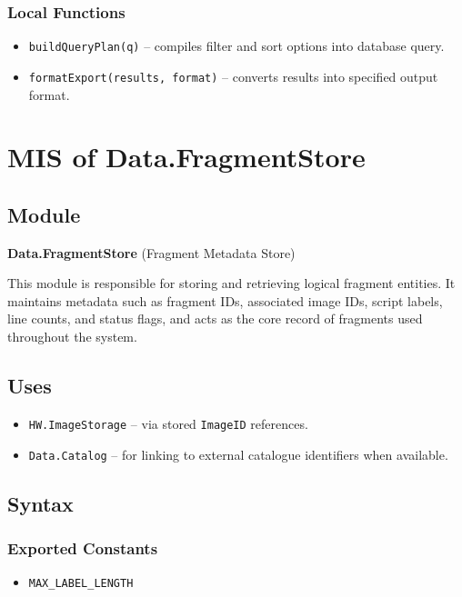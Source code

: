 \documentclass[12pt, titlepage]{article}
\begin{document}
\subsubsection{Local Functions}
\begin{itemize}
    \item \texttt{buildQueryPlan(q)} – compiles filter and sort options into database query.
    \item \texttt{formatExport(results, format)} – converts results into specified output format.
\end{itemize}


\section{MIS of Data.FragmentStore} \label{Data.FragmentStore}

\subsection{Module}
\textbf{Data.FragmentStore} \; (Fragment Metadata Store)

This module is responsible for storing and retrieving logical fragment entities. It maintains metadata such as fragment IDs, associated image IDs, script labels, line counts, and status flags, and acts as the core record of fragments used throughout the system.

\subsection{Uses}
\begin{itemize}
    \item \texttt{HW.ImageStorage} – via stored \texttt{ImageID} references.
    \item \texttt{Data.Catalog} – for linking to external catalogue identifiers when available.
\end{itemize}

\subsection{Syntax}

\subsubsection{Exported Constants}
\begin{itemize}
    \item \texttt{MAX\_LABEL\_LENGTH}
\end{itemize}
\end{document}
